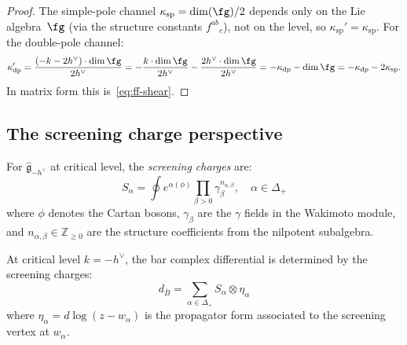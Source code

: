 \begin{proof}
The simple-pole channel $\kappa_{\mathrm{sp}} =
\dim(\fg)/2$ depends only on the Lie algebra~$\fg$ (via the
structure constants $f^{ab}{}_c$), not on the level, so
$\kappa_{\mathrm{sp}}' = \kappa_{\mathrm{sp}}$.
For the double-pole channel:
\[
\kappa_{\mathrm{dp}}'
= \frac{(-k - 2h^\vee) \cdot \dim\fg}{2h^\vee}
= -\frac{k \cdot \dim\fg}{2h^\vee}
  - \frac{2h^\vee \cdot \dim\fg}{2h^\vee}
= -\kappa_{\mathrm{dp}} - \dim\fg
= -\kappa_{\mathrm{dp}} - 2\kappa_{\mathrm{sp}}.
\]
In matrix form this is~\eqref{eq:ff-shear}.
\end{proof}

\subsection{The screening charge perspective}

\begin{definition}
For $\widehat{\mathfrak{g}}_{-h^\vee}$ at critical level, the \emph{screening charges} are:
\begin{equation}
S_\alpha = \oint e^{\alpha(\phi)} \prod_{\beta > 0} \gamma_\beta^{n_{\alpha,\beta}}, \quad \alpha \in \Delta_+
\end{equation}
where $\phi$ denotes the Cartan bosons, $\gamma_\beta$ are the $\gamma$ fields in the Wakimoto module, and $n_{\alpha,\beta} \in \mathbb{Z}_{\geq 0}$ are the structure coefficients from the nilpotent subalgebra.
\end{definition}

\begin{theorem}\label{thm:screening-bar}
At critical level $k = -h^\vee$, the bar complex differential is determined by the screening charges:
\begin{equation}
d_{\bar{B}} = \sum_{\alpha \in \Delta_+} S_\alpha \otimes \eta_\alpha
\end{equation}
where $\eta_\alpha = d\log(z - w_\alpha)$ is the propagator form associated to the screening vertex at $w_\alpha$.
\end{theorem}

